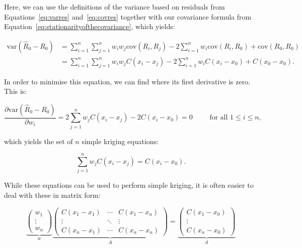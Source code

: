 Here, we can use the definitions of the variance based on residuals from Equations~\ref{eq:varres} and~\ref{eq:covres} together with our covariance formula from Equation~\ref{eq:stationarityofthecovariance}, which yields:

\begin{align}
\mathrm{var}\left(\hat{R}_0 - R_0\right) &= \sum_{i=1}^n \sum_{j=1}^n w_i w_j \mathrm{cov}(R_i, R_j) - 2\sum_{i=1}^n w_i \mathrm{cov}(R_i,R_0) + \mathrm{cov}(R_0, R_0) \label{eq:variancesk} \\
&= \sum_{i=1}^n \sum_{j=1}^n w_i w_j C(x_i-x_j) - 2\sum_{i=1}^n w_i C(x_i-x_0) + C(x_0-x_0).
\end{align}

In order to minimise this equation, we can find where its first derivative is zero.
This is:

\begin{equation}
\frac{\partial \mathrm{var}\left(\hat{R}_0 - R_0\right)}{\partial w_i} = 2 \sum_{j=1}^n w_j C(x_i-x_j) - 2C(x_i-x_0) = 0 \hspace{1cm} \text{for all } 1 \leq i \leq n, \nonumber
\end{equation}

which yields the set of \(n\) simple kriging equations:

\begin{equation}
\sum_{j=1}^n w_j C(x_i-x_j) = C(x_i-x_0).
\end{equation}

While these equations can be used to perform simple kriging, it is often easier to deal with these in matrix form:

\begin{equation}
\underbrace{\left(\begin{array}{c}
w_1 \\
\vdots \\
w_n \end{array} \right)}_{w}
%
\underbrace{\left( \begin{array}{ccc}
C(x_1-x_1) & \cdots & C(x_1-x_n) \\
\vdots & \ddots & \vdots \\
C(x_n-x_1) & \cdots & C(x_n-x_n) \end{array} \right)}_{A}
 = 
%
\underbrace{\left(\begin{array}{c}
C(x_1-x_0) \\
\vdots \\
C(x_n-x_0) \end{array} \right)}_{d}
\end{equation}

